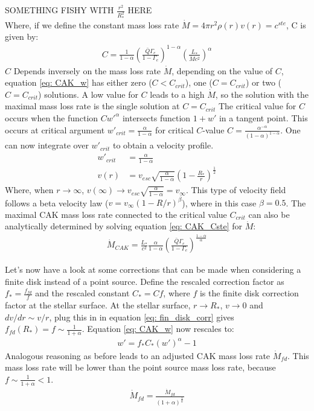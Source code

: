 SOMETHING FISHY WITH $\frac{r^2}{R_*^2}$ HERE\\

Where, if we define the constant mass loss rate $\dot{M} = 4\pi r^2 \rho(r) v(r) = c^{ste}$, C is given by:
\begin{align}
C = \frac{1}{1-\alpha} \left(\frac{\bar{Q}\Gamma_e}{1-\Gamma_e} \right)^{1-\alpha} \left(\frac{L_*}{\dot{M}c^2}\right)^\alpha \label{eq: CAK_Cste}
\end{align}
$C$ Depends inversely on the mass loss rate $\dot{M}$, depending on the value of $C$, equation \ref{eq: CAK_w} has either zero ($C < C_{crit}$), one ($C = C_{crit}$) or two ($C = C_{crit}$) solutions. A low value for $C$ leads to a high $\dot{M}$, so the solution with the maximal mass loss rate is the single solution at $C = C_{crit}$ The critical value for $C$ occurs when the function $C w'^\alpha$ intersects function $1 + w'$ in a tangent point. This occurs at critical argument $w'_{crit} = \frac{\alpha}{1-\alpha}$ for critical $C$-value $C = \frac{\alpha^{-\alpha}}{(1-\alpha)^{1-\alpha}}$. One can now integrate over $w'_{crit}$ to obtain a velocity profile.
\begin{align}
w'_{crit} &= \frac{\alpha}{1-\alpha} \\
v(r) &= v_{esc} \sqrt{\frac{\alpha}{1-\alpha}} \left(1 - \frac{R_*}{r} \right)^\frac{1}{2}
\end{align}
Where, when $r\rightarrow\infty$, $v(\infty) \rightarrow v_{esc} \sqrt{\frac{\alpha}{1-\alpha}} = v_\infty$. This type of velocity field follows a beta velocity law ($v = v_\infty (1-R/r)^\beta$), where in this case $\beta = 0.5$. The maximal CAK mass loss rate connected to the critical value $C_{crit}$ can also be analytically determined by solving equation \ref{eq: CAK_Cste} for $\dot{M}$:
\begin{align}
\dot{M}_{CAK} = \frac{L_*}{c^2} \frac{\alpha}{1-\alpha}\left(\frac{\bar{Q}\Gamma_e}{1-\Gamma_e}\right)^{\frac{1-\alpha}{\alpha}}
\end{align}

Let's now have a look at some corrections that can be made when considering a finite disk instead of a point source. Define the rescaled correction factor as $f_* = \frac{f_{fd}}{f}$ and the rescaled constant $C_* = C f$, where $f$ is the finite disk correction factor at the stellar surface. At the stellar surface, $r \rightarrow R_*$, $v \rightarrow 0$ and $dv/dr \sim v/r$, plug this in in equation \ref{eq: fin_disk_corr} gives $f_{fd}(R_*) = f \sim \frac{1}{1+\alpha}$. Equation \ref{eq: CAK_w} now rescales to:
\begin{align}
w' = f_* C_* (w')^\alpha - 1 
\end{align}
Analogous reasoning as before leads to an adjusted CAK mass loss rate $\dot{M}_{fd}$. This mass loss rate will be lower than the point source mass loss rate, because $f \sim \frac{1}{1+\alpha}  < 1$.
\begin{align}
\dot{M}_{fd} = \frac{\dot{M}_{fd}}{(1+\alpha)^\frac{1}{\alpha}}
\end{align} 

